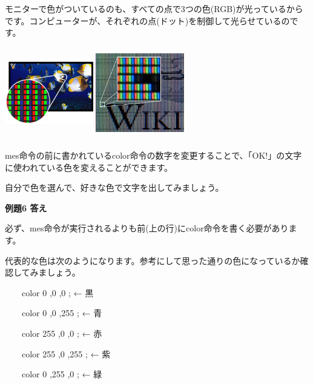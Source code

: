 \documentclass[a4paper,12pt]{jarticle}
\begin{document}
モニターで色がついているのも、すべての点で3つの色(RGB)が光っているからです。コンピューターが、それぞれの点(ドット)を制御して光らせているのです。


\bigskip
\bigskip

\begin{minipage}{11.781cm}
\centering
{\upshape
\includegraphics[keepaspectratio,width=3.854cm,height=3.988cm]{text02-img/text02-img034.jpg}
\includegraphics[keepaspectratio,width=3.854cm,height=3.988cm]{text02-img/text02-img035.jpg}}
\end{minipage}

\bigskip
\bigskip
\bigskip

mes命令の前に書かれているcolor命令の数字を変更することで、「OK!」の文字に使われている色を変えることができます。

自分で色を選んで、好きな色で文字を出してみましょう。

\bigskip


\bigskip

{\bfseries
例題6 答え}


\bigskip

必ず、mes命令が実行されるよりも前(上の行)にcolor命令を書く必要があります。

代表的な色は次のようになります。参考にして思った通りの色になっているか確認してみましょう。


\bigskip

\ \ \ \ color 0 ,0 ,0 ; ← 黒 

\ \ \ \ color 0 ,0 ,255 ; ← 青 

\ \ \ \ color 255 ,0 ,0 ; ← 赤 

\ \ \ \ color 255 ,0 ,255 ; ← 紫 

\ \ \ \ color 0 ,255 ,0 ; ← 緑 
\end{document}
